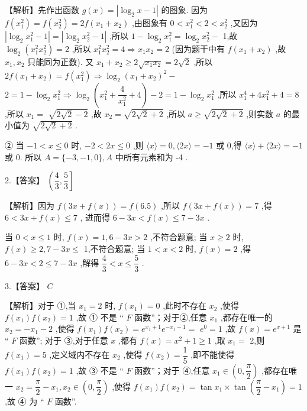 \documentclass[10pt]{article}
\begin{document}
【解析】先作出函数 $g\left( x\right)  = \left| {{\log }_{2}x - 1}\right|$ 的图象. 因为 $f\left( {x}_{1}^{2}\right)  = f\left( {x}_{2}^{2}\right)  = {2f}\left( {{x}_{1} + {x}_{2}}\right)$ ,由图象有 $0 < {x}_{1}^{2} < 2 < {x}_{2}^{2}$ ,又因为 $\left| {{\log }_{2}{x}_{1}^{2} - 1}\right|  = \left| {{\log }_{2}{x}_{2}^{2} - 1}\right|$ ,所以 $1 - {\log }_{2}{x}_{1}^{2} = {\log }_{2}{x}_{2}^{2} -$ 1,故 ${\log }_{2}\left( {{x}_{1}^{2}{x}_{2}^{2}}\right)  = 2$ ,所以 ${x}_{1}^{2}{x}_{2}^{2} = 4 \Rightarrow  {x}_{1}{x}_{2} = 2$ (因为题干中有 $f\left( {{x}_{1} + {x}_{2}}\right)$ ,故 ${x}_{1},{x}_{2}$ 只能同为正数). 又 ${x}_{1} + {x}_{2} \geq  2\sqrt{{x}_{1}{x}_{2}} = 2\sqrt{2}$ ,所以 ${2f}\left( {{x}_{1} + {x}_{2}}\right)  = f\left( {x}_{1}^{2}\right)  \Rightarrow  {\log }_{2}{\left( {x}_{1} + {x}_{2}\right) }^{2} -$  $2 = 1 - {\log }_{2}{x}_{1}^{2} \Rightarrow  {\log }_{2}\left( {{x}_{1}^{2} + \dfrac{4}{{x}_{1}^{2}} + 4}\right)  - 2 = 1 - {\log }_{2}{x}_{1}^{2}$ ,所以 ${x}_{1}^{4} + 4{x}_{1}^{2} + 4 = 8$ ,所以 ${x}_{1} =$  $\sqrt{2\sqrt{2} - 2}$ ,故 ${x}_{2} = \sqrt{2\sqrt{2} + 2}$ ,所以 $a \geq  \sqrt{2\sqrt{2} + 2}$ ,则实数 $a$ 的最小值为 $\sqrt{2\sqrt{2} + 2}$ .

② 当 $- 1 < x \leq  0$ 时, $- 2 < {2x} \leq  0$ ,则 $\langle x\rangle  = 0,\langle {2x}\rangle  =  - 1$ 或 0,得 $\langle x\rangle  + \langle {2x}\rangle  =  - 1$ 或 0. 所以 $A = \{  - 3, - 1,0\} ,A$ 中所有元素和为 -4 .

2.【答案】 $\left( {\dfrac{4}{3},\dfrac{5}{3}}\right\rbrack$

【解析】因为 $f\left( {{3x} + f\left( x\right) }\right)  = f\left( {6.5}\right)$ ,所以 $f\left( {{3x} + f\left( x\right) }\right)  = 7$ ,得 $6 < {3x} + f\left( x\right)  \leq  7$ , 进而得 $6 - {3x} < f\left( x\right)  \leq  7 - {3x}$ .

当 $0 < x \leq  1$ 时, $f\left( x\right)  = 1,6 - {3x} > 2$ ,不符合题意; 当 $x \geq  2$ 时, $f\left( x\right)  \geq  2,7 - {3x} \leq$ 1,不符合题意; 当 $1 < x < 2$ 时, $f\left( x\right)  = 2$ ,得 $6 - {3x} < 2 \leq  7 - {3x}$ ,解得 $\dfrac{4}{3} < x \leq  \dfrac{5}{3}$ .

3.【答案】 ${C}$

【解析】对于 ①,当 ${x}_{1} = 2$ 时, $f\left( {x}_{1}\right)  = 0$ ,此时不存在 ${x}_{2}$ ,使得 $f\left( {x}_{1}\right) f\left( {x}_{2}\right)  = 1$ ,故 ① 不是 “ $F$ 函数”；对于②,任意 ${x}_{1}$ ,都存在唯一的 ${x}_{2} =  - {x}_{1} - 2$ ,使得 $f\left( {x}_{1}\right) f\left( {x}_{2}\right)  = {{e}}^{{x}_{1} + 1}{{e}}^{-{x}_{1} - 1} =$  ${{e}}^{0} = 1$ ,故 $f\left( x\right)  = {{e}}^{x + 1}$ 是 “ $F$ 函数”; 对于 ③,对于任意 $x$ ,都有 $f\left( x\right)  = {x}^{2} + 1 \geq  1$ ,取 ${x}_{1} =$ 2,则 $f\left( {x}_{1}\right)  = 5$ ,定义域内不存在 ${x}_{2}$ ,使得 $f\left( {x}_{2}\right)  = \dfrac{1}{5}$ ,即不能使得 $f\left( {x}_{1}\right) f\left( {x}_{2}\right)  = 1$ ,故 ③ 不是 “ $F$ 函数”；对于 ④,任意 ${x}_{1} \in  \left( {0,\dfrac{\pi }{2}}\right)$ ,都存在唯一 ${x}_{2} = \dfrac{\pi }{2} - {x}_{1},{x}_{2} \in  \left( {0,\dfrac{\pi }{2}}\right)$ ,使得 $f\left( {x}_{1}\right) f\left( {x}_{2}\right)  = \tan {x}_{1} \times  \tan \left( {\dfrac{\pi }{2} - {x}_{1}}\right)  = 1$ ,故 ④ 为 “ $F$ 函数”.
\end{document}
